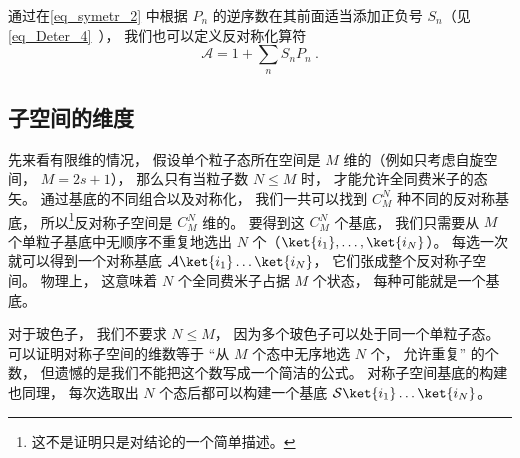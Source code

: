 通过在\autoref{eq_symetr_2} 中根据 $P_n$ 的逆序数在其前面适当添加正负号 $S_n$（见\autoref{eq_Deter_4}~）， 我们也可以定义反对称化算符
\begin{equation}
\mathcal A = 1 + \sum_n S_n P_n~.
\end{equation}

\subsection{子空间的维度}
先来看有限维的情况， 假设单个粒子态所在空间是 $M$ 维的（例如只考虑自旋空间， $M = 2s+1$）， 那么只有当粒子数 $N \le M$ 时， 才能允许全同费米子的态矢。 通过基底的不同组合以及对称化， 我们一共可以找到 $C_M^N$ 种不同的反对称基底， 所以\footnote{这不是证明只是对结论的一个简单描述。}反对称子空间是 $C_M^N$ 维的。 要得到这 $C_M^N$ 个基底， 我们只需要从 $M$ 个单粒子基底中无顺序不重复地选出 $N$ 个（$\ket{i_1}, \dots, \ket{i_N}$）。 每选一次就可以得到一个对称基底 $\mathcal A \ket{i_1}\dots\ket{i_N}$， 它们张成整个反对称子空间。 物理上， 这意味着 $N$ 个全同费米子占据 $M$ 个状态， 每种可能就是一个基底。

对于玻色子， 我们不要求 $N \le M$， 因为多个玻色子可以处于同一个单粒子态。 可以证明对称子空间的维数等于 “从 $M$ 个态中无序地选 $N$ 个， 允许重复” 的个数， 但遗憾的是我们不能把这个数写成一个简洁的公式。 对称子空间基底的构建也同理， 每次选取出 $N$ 个态后都可以构建一个基底 $\mathcal S \ket{i_1}\dots\ket{i_N}$。
